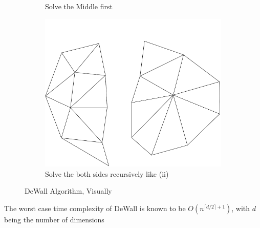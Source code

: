 \begin{figure}[H]
\begin{subfigure}[b]{0.3\textwidth}
         \caption{Solve the Middle first}
         \label{fig:three sin x}
     \end{subfigure}
     \hfill
     \begin{subfigure}[b]{0.3\textwidth}
         \centering
         \includegraphics[width=\textwidth]{02NaiveSub.png}
         \caption{Solve the both sides recursively like (ii)}
         \label{fig:five over x}
     \end{subfigure}
        \caption{DeWall Algorithm, Visually}
        \label{fig:three graphs}
\end{figure}
The worst case time complexity of DeWall is known to be $O(n^{\lceil d/2 \rceil +1})$, with $d$ being the number of dimensions
